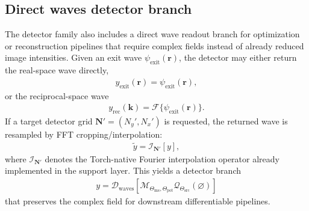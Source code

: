 \documentclass[11pt]{article}
\begin{document}
\subsection{Direct waves detector branch}
The detector family also includes a direct wave readout branch for optimization or
reconstruction pipelines that require complex fields instead of already reduced image
intensities.  Given an exit wave $\psi_{\mathrm{exit}}(\mathbf{r})$, the detector may
either return the real-space wave directly,
\begin{align}
  y_{\mathrm{exit}}(\mathbf{r}) = \psi_{\mathrm{exit}}(\mathbf{r}),
\end{align}
or the reciprocal-space wave
\begin{align}
  y_{\mathrm{rec}}(\mathbf{k}) = \mathcal{F}\{\psi_{\mathrm{exit}}(\mathbf{r})\}.
\end{align}
If a target detector grid $\mathbf{N}'=(N_y',N_x')$ is requested, the returned wave is
resampled by FFT cropping/interpolation:
\begin{align}
  \tilde{y} = \mathcal{I}_{\mathbf{N}'}[y],
\end{align}
where $\mathcal{I}_{\mathbf{N}'}$ denotes the Torch-native Fourier interpolation
operator already implemented in the support layer.  This yields a detector branch
\begin{align}
  y = \mathcal{D}_{\mathrm{waves}}
  \left[
    \mathcal{M}_{\Theta_{\mathrm{ms}},\Theta_{\mathrm{pot}}}
    \mathcal{Q}_{\Theta_{\mathrm{src}}}(\varnothing)
  \right]
\end{align}
that preserves the complex field for downstream differentiable pipelines.
\end{document}
